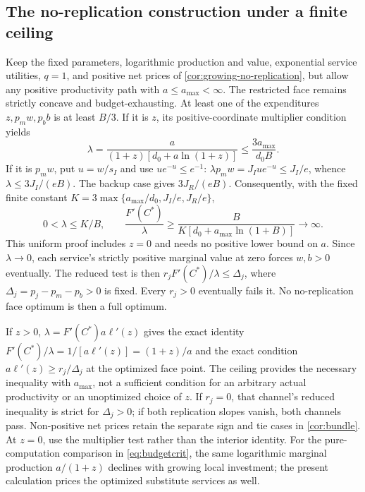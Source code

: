 \subsection{The no-replication construction under a finite ceiling}
\label{app:norep-ceiling-proof}
Keep the fixed parameters, logarithmic production and value, exponential
service utilities, $q=1$, and positive net prices of
\cref{cor:growing-no-replication}, but allow any positive productivity
path with $a\leq a_{\max}<\infty$. The restricted face remains strictly
concave and budget-exhausting. At least one of the expenditures
$z,p_mw,p_bb$ is at least $B/3$. If it is $z$, its positive-coordinate
multiplier condition yields
\[
 \lambda=\frac{a}{(1+z)[d_0+a\ln(1+z)]}
 \leq\frac{3a_{\max}}{d_0B}.
\]
If it is $p_mw$, put $u=w/s_I$ and use $u e^{-u}\leq e^{-1}$:
$\lambda p_mw=J_Iu e^{-u}\leq J_I/e$, whence
$\lambda\leq3J_I/(eB)$. The backup case gives $3J_R/(eB)$.
Consequently, with the fixed finite constant
$K=3\max\{a_{\max}/d_0,J_I/e,J_R/e\}$,
\begin{equation}
 0<\lambda\leq K/B,\qquad
 \frac{F'(C^*)}{\lambda}
 \geq\frac{B}{K[d_0+a_{\max}\ln(1+B)]}\longrightarrow\infty.
 \label{eq:norep-ceiling-bound}
\end{equation}
This uniform proof includes $z=0$ and needs no positive lower bound on
$a$. Since $\lambda\to0$, each service's strictly positive marginal
value at zero forces $w,b>0$ eventually. The reduced test is then
$r_jF'(C^*)/\lambda\leq\Delta_j$, where
$\Delta_j=p_j-p_m-p_b>0$ is fixed. Every $r_j>0$ eventually fails it.
No no-replication face optimum is then a full optimum.

If $z>0$, $\lambda=F'(C^*)a\ell'(z)$ gives the exact identity
$F'(C^*)/\lambda=1/[a\ell'(z)]=(1+z)/a$ and the exact condition
$a\ell'(z)\geq r_j/\Delta_j$ at the optimized face point.
The ceiling provides the necessary inequality with $a_{\max}$, not a
sufficient condition for an arbitrary actual productivity or an
unoptimized choice of $z$. If $r_j=0$, that channel's reduced inequality
is strict for $\Delta_j>0$; if both replication slopes vanish, both
channels pass. Non-positive net prices retain the separate sign and tie
cases in \cref{cor:bundle}. At $z=0$, use the multiplier test rather than
the interior identity. For the pure-computation comparison in
\cref{eq:budgetcrit}, the same logarithmic marginal production
$a/(1+z)$ declines with growing local investment; the present calculation
prices the optimized substitute services as well.
